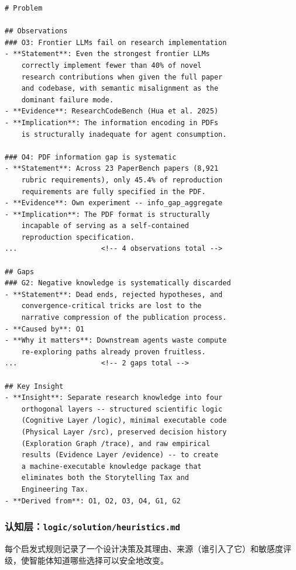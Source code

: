 \begin{lstlisting}[basicstyle=\ttfamily\scriptsize]
# Problem

## Observations
### O3: Frontier LLMs fail on research implementation
- **Statement**: Even the strongest frontier LLMs
    correctly implement fewer than 40% of novel
    research contributions when given the full paper
    and codebase, with semantic misalignment as the
    dominant failure mode.
- **Evidence**: ResearchCodeBench (Hua et al. 2025)
- **Implication**: The information encoding in PDFs
    is structurally inadequate for agent consumption.

### O4: PDF information gap is systematic
- **Statement**: Across 23 PaperBench papers (8,921
    rubric requirements), only 45.4% of reproduction
    requirements are fully specified in the PDF.
- **Evidence**: Own experiment -- info_gap_aggregate
- **Implication**: The PDF format is structurally
    incapable of serving as a self-contained
    reproduction specification.
...                    <!-- 4 observations total -->

## Gaps
### G2: Negative knowledge is systematically discarded
- **Statement**: Dead ends, rejected hypotheses, and
    convergence-critical tricks are lost to the
    narrative compression of the publication process.
- **Caused by**: O1
- **Why it matters**: Downstream agents waste compute
    re-exploring paths already proven fruitless.
...                    <!-- 2 gaps total -->

## Key Insight
- **Insight**: Separate research knowledge into four
    orthogonal layers -- structured scientific logic
    (Cognitive Layer /logic), minimal executable code
    (Physical Layer /src), preserved decision history
    (Exploration Graph /trace), and raw empirical
    results (Evidence Layer /evidence) -- to create
    a machine-executable knowledge package that
    eliminates both the Storytelling Tax and
    Engineering Tax.
- **Derived from**: O1, O2, O3, O4, G1, G2
\end{lstlisting}

\subsubsection{认知层：\texttt{logic/solution/heuristics.md}}

每个启发式规则记录了一个设计决策及其理由、来源（谁引入了它）和敏感度评级，使智能体知道哪些选择可以安全地改变。

